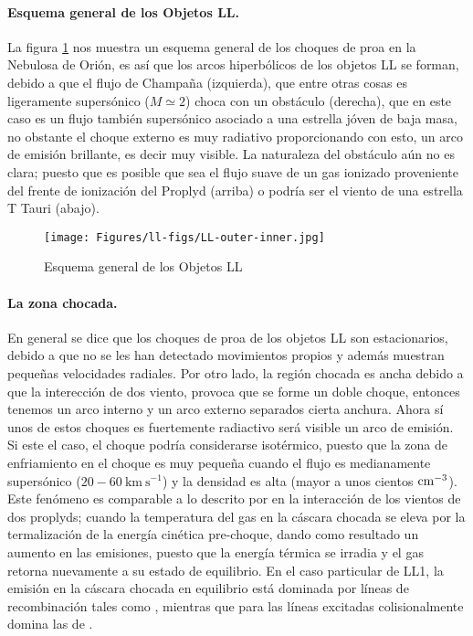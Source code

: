 \paragraph{Esquema general de los Objetos LL.} La figura \ref{fig:esquema-arcos} nos muestra un esquema general de los choques de proa en la Nebulosa de Orión, es así que los arcos hiperbólicos de los objetos LL se forman, debido a que el flujo de Champaña (izquierda), que entre otras cosas es ligeramente supersónico (\(M\simeq2\)) choca con un obstáculo (derecha), que en este caso es un flujo también supersónico asociado a una estrella jóven de baja masa, no obstante el choque externo es muy radiativo proporcionando con esto, un arco de emisión brillante, es decir muy visible. La naturaleza del obstáculo aún no es clara; puesto que  es posible que sea el flujo suave de un gas ionizado proveniente del frente de ionización del Proplyd (arriba) o podría ser el viento de una estrella T Tauri (abajo).\\ 

\begin{figure}
  \centering
  \texttt{[image: Figures/ll-figs/LL-outer-inner.jpg]}
  \caption{Esquema general de los Objetos LL}
  \label{fig:esquema-arcos}
\end{figure}

\paragraph{La zona chocada.} En general se dice que los choques de proa de los objetos LL son estacionarios, debido a que no se les han detectado movimientos propios y además muestran pequeñas velocidades radiales. Por otro lado, la región chocada es ancha debido a que la interección de dos viento, provoca que se forme un doble choque, entonces tenemos un arco interno y un arco externo separados cierta anchura. Ahora sí unos de estos choques es fuertemente radiactivo será visible un arco de emisión. Si este el caso, el choque podría considerarse isotérmico, puesto que la  zona de enfriamiento en el choque es muy pequeña cuando el flujo es medianamente supersónico (\(20-60~\text{km}~\text{s}^{-1}\)) y la densidad es alta (mayor a unos cientos \(\mathrm{cm}^{-3}\)). Este fenómeno es comparable a lo descrito por \citet{Henney:2002} en la interacción de los vientos de dos proplyds; cuando la temperatura del gas en la cáscara chocada se eleva por la termalización de la energía cinética pre-choque, dando como resultado un aumento en las emisiones, puesto que la energía térmica se irradia y el gas retorna nuevamente a su estado de equilibrio. En el caso particular de LL1, la emisión en la cáscara chocada en equilibrio está dominada por líneas de recombinación tales como \ha{}, mientras que para las líneas excitadas colisionalmente domina las de \oiii{}. \\ 

